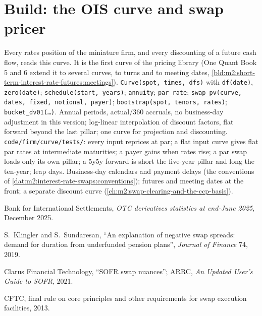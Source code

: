 \section{Build: the OIS curve and swap pricer}\label{bld:m2:interest-rate-swaps:curve}

\begin{build}
 Every rates position of the miniature firm, and every
discounting of a future cash flow, reads this curve. It is the first curve of
the pricing library (One Quant Book 5 and 6 extend it to several curves, to
turns and to meeting dates, \cref{bld:m2:short-term-interest-rate-futures:meetings}).
 \texttt{Curve(spot, times, dfs)} with \texttt{df(date)},
\texttt{zero(date)}; \texttt{schedule(start, years)}; \texttt{annuity};
\texttt{par\_rate}; \texttt{swap\_pv(curve, dates, fixed, notional, payer)};
\texttt{bootstrap(spot, tenors, rates)}; \texttt{bucket\_dv01(\ldots)}.
 Annual periods, actual/360 accruals, no business-day adjustment
in this version; log-linear interpolation of discount factors, flat forward
beyond the last pillar; one curve for projection and discounting.
 \texttt{code/firm/curve/tests/}: every input reprices
at par; a flat input curve gives flat par rates at intermediate maturities; a
payer gains when rates rise; a par swap loads only its own pillar; a 5y5y
forward is short the five-year pillar and long the ten-year; leap days.
 Business-day calendars and payment delays (the conventions of
\cref{dat:m2:interest-rate-swaps:conventions}); futures and meeting dates at the
front; a separate discount curve (\cref{ch:m2:swap-clearing-and-the-ccp-basis}).
\end{build}

\begin{omsources}
\item Bank for International Settlements, \emph{OTC derivatives statistics at
end-June 2025}, December 2025.
\item S.\ Klingler and S.\ Sundaresan, ``An explanation of negative swap spreads:
demand for duration from underfunded pension plans'', \emph{Journal of
Finance} 74, 2019.
\item Clarus Financial Technology, ``SOFR swap nuances''; ARRC, \emph{An
Updated User's Guide to SOFR}, 2021.
\item CFTC, final rule on core principles and other requirements for swap
execution facilities, 2013.
\end{omsources}

